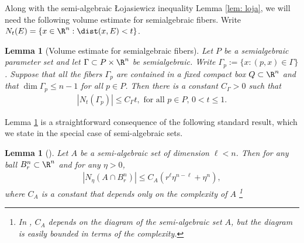 \documentclass{article}
\numberwithin{equation}{section}
\theoremstyle{plain}
\newtheorem{lemma}[theorem]{Lemma}
\begin{document}
Along with the semi-algebraic \L ojasiewicz inequality Lemma \ref{lem: loja}, we will need the following volume estimate for semialgebraic fibers. Write $N_t(E) = \{x \in \R^n : \dist(x,E) < t \}$. 




\begin{lemma}[Volume estimate for semialgebraic fibers]\label{lem: semialg fiber est}
    Let $P$ be a semialgebraic parameter set and let $\Gamma \subset P \times \R^n$ be semialgebraic. Write $\Gamma_p := \{x : (p,x) \in \Gamma\}$. Suppose that all the fibers $\Gamma_p$ are contained in a fixed compact box $Q \subset \R^n$ and that $\dim \Gamma_p \leq n-1$ for all $p \in P$. Then there is a constant $C_\Gamma >0$ such that 
    \begin{align}
        |N_t(\Gamma_p)| \leq C_\Gamma t, \text{ for all $p \in P$, $0 < t \leq 1$}.
    \end{align}
\end{lemma}

Lemma \ref{lem: semialg fiber est} is a straightforward consequence of the following standard result, which we state in the special case of semi-algebraic sets. 

\begin{lemma}[]\label{lem: tame geometry lemma}
    Let $A$ be a semi-algebraic set of dimension $\ell < n$. Then for any ball $B_r^n \subset \R^n$ and for any $\eta > 0$, 
    \begin{align}
        |N_\eta(A \cap B_r^n)| \leq C_A (r^\ell \eta^{n-\ell} + \eta^n),
    \end{align}
    where $C_A$ is a constant that depends only on the complexity of $A$ \footnote{In \cite{tameGeometry}, $C_A$ depends on the \emph{diagram} of the semi-algebraic set $A$, but the diagram is easily bounded in terms of the complexity.}
\end{lemma}
\end{document}
